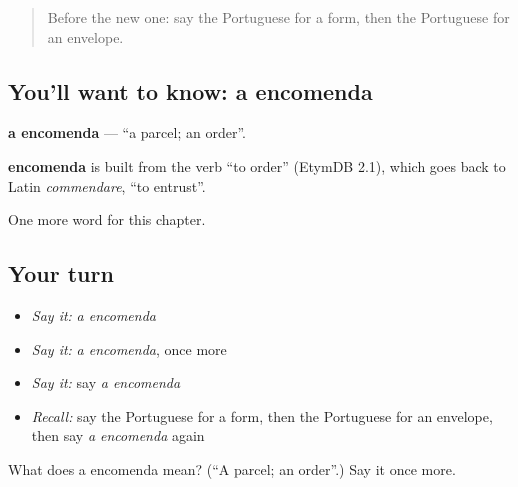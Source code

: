 \begin{quote}
Before the new one: say the Portuguese for a form, then the Portuguese for an envelope.
\end{quote}

\subsection*{You'll want to know: a encomenda}
\textbf{a encomenda} — \textquotedblleft{}a parcel; an order\textquotedblright{}.

\begin{cousinweb}
\textbf{encomenda} is built from the verb \textquotedblleft{}to order\textquotedblright{} (EtymDB 2.1), which goes back to Latin \emph{commendare}, \textquotedblleft{}to entrust\textquotedblright{}.
\end{cousinweb}

\begin{grammarlens}[title={What you've built}]
One more word for this chapter.
\end{grammarlens}

\subsection*{Your turn}
\begin{itemize}
\raggedright
  \item \emph{Say it:} \emph{a encomenda}
  \item \emph{Say it:} \emph{a encomenda}, once more
  \item \emph{Say it:} say \emph{a encomenda}
  \item \emph{Recall:} say the Portuguese for a form, then the Portuguese for an envelope, then say \emph{a encomenda} again
\end{itemize}

\begin{tcolorbox}[breakable,colback=teal!4,colframe=teal!35!black,title={Before you move on}]
What does a encomenda mean? (\textquotedblleft{}A parcel; an order\textquotedblright{}.) Say it once more.
\end{tcolorbox}
